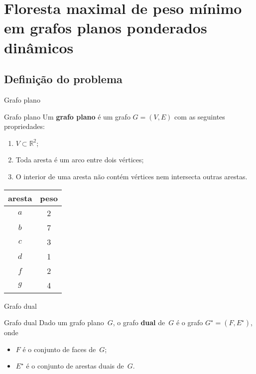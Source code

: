 \documentclass{IFES-beamer}
\newcommand{\R}{\mathbb{R}}
\newcommand{\defi}[1]{\textbf{#1}} %
\begin{document}
\section[MSF]{Floresta maximal de peso mínimo em grafos planos ponderados dinâmicos}

\subsection{Definição do problema}
\begin{frame}{Grafo plano}
\begin{block}{Grafo plano}
Um \defi{grafo plano} é um grafo $G = (V, E)$ com as seguintes propriedades:
\begin{enumerate}
\item $V\subset \R^2$;
\item Toda aresta é um arco entre dois vértices;
\item O interior de uma aresta não contém vértices nem intersecta outras arestas.
\end{enumerate}
\end{block}
\begin{minipage}[H]{0.4\textwidth}
\begin{tabular}{| c | c |} 
 \hline
 aresta & peso\\
 \hline
 $a$ & 2 \\ 
 \hline
$b$ & 7 \\
 \hline
$c$ & 3 \\
 \hline
$d$ & 1 \\
 \hline
$f$ & 2 \\
 \hline
$g$ & 4 \\
 \hline
\end{tabular}
\end{minipage}
\begin{minipage}[H]{0.4\textwidth}
\begin{figure}[H]
\scalebox{1}{

	}
\end{figure}
\end{minipage}

\end{frame}




\begin{frame}{Grafo dual}
\begin{block}{Grafo dual}
Dado um grafo plano~$G$, o grafo \defi{dual} de~$G$ é o grafo $G^\star = (F,E^\star)$, onde
\begin{itemize}
\item $F$ é o conjunto de faces de~$G$;
\item $E^\star$ é o conjunto de arestas duais de~$G$.
\end{itemize}
\end{block}
\begin{figure}[H]
\scalebox{1.2}{
\centering

}
\label{fig:MSF-basico-1}
\end{figure}
\end{frame}
\end{document}
